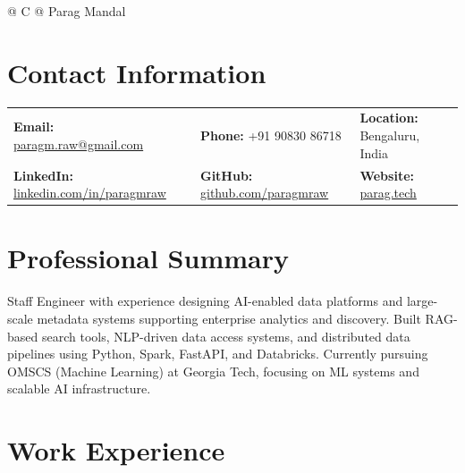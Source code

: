 \documentclass[a4paper,10pt]{article}
\begin{document}
\pagestyle{empty} 

\begin{tabularx}{\linewidth}{@{} C @{}}
\Huge{Parag Mandal} \\[6pt]
\end{tabularx}

\section*{Contact Information}
\vspace{1mm}
\begin{tabularx}{\linewidth}{@{} >{\raggedright\arraybackslash}X >{\raggedright\arraybackslash}X >{\raggedright\arraybackslash}X @{} }
\textbf{Email:} \href{mailto:paragm.raw@gmail.com}{paragm.raw@gmail.com} & \textbf{Phone:} +91 90830 86718 & \textbf{Location:} Bengaluru, India \\
\textbf{LinkedIn:} \href{https://linkedin.com/in/paragmraw}{linkedin.com/in/paragmraw} & \textbf{GitHub:} \href{https://github.com/paragmraw}{github.com/paragmraw} & \textbf{Website:} \href{https://parag.tech}{parag.tech} \\
\end{tabularx}
\vspace{1mm}

\section*{Professional Summary}
\vspace{1mm}
Staff Engineer with experience designing AI-enabled data platforms and large-scale metadata systems supporting enterprise analytics and discovery. Built RAG-based search tools, NLP-driven data access systems, and distributed data pipelines using Python, Spark, FastAPI, and Databricks. Currently pursuing OMSCS (Machine Learning) at Georgia Tech, focusing on ML systems and scalable AI infrastructure.
\vspace{1mm}

\section*{Work Experience}
\vspace{1mm}
\end{document}
